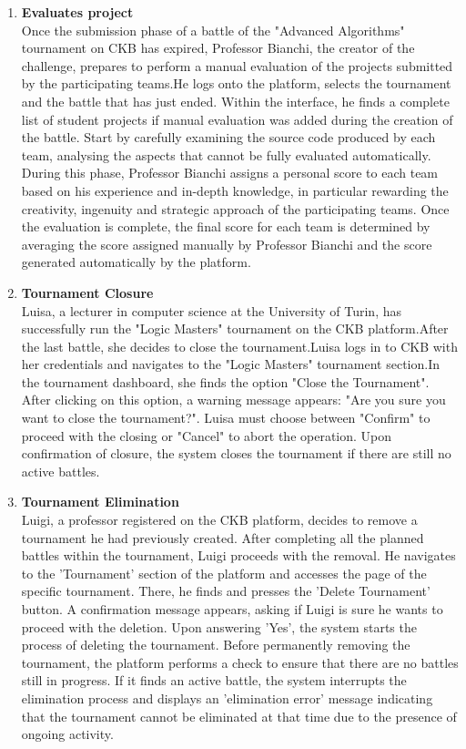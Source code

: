 \begin{enumerate}[label=\textbf{\Alph*}.]
\item \textbf{Evaluates project} \\
Once the submission phase of a battle of the "Advanced Algorithms" tournament on CKB has expired, Professor Bianchi, the creator of the challenge, prepares to perform a manual evaluation of the projects submitted by the participating teams.He logs onto the platform, selects the tournament and the battle that has just ended. Within the interface, he finds a complete list of student projects if manual evaluation was added during the creation of the battle.
Start by carefully examining the source code produced by each team, analysing the aspects that cannot be fully evaluated automatically.
During this phase, Professor Bianchi assigns a personal score to each team based on his experience and in-depth knowledge, in particular rewarding the creativity, ingenuity and strategic approach of the participating teams. Once the evaluation is complete, the final score for each team is determined by averaging the score assigned manually by Professor Bianchi and the score generated automatically by the platform.
\item \textbf{Tournament Closure}\\
Luisa, a lecturer in computer science at the University of Turin, has successfully run the "Logic Masters" tournament on the CKB platform.After the last battle, she decides to close the tournament.Luisa logs in to CKB with her credentials and navigates to the "Logic Masters" tournament section.In the tournament dashboard, she finds the option "Close the Tournament".	After clicking on this option, a warning message appears: "Are you sure you want to close the tournament?".
Luisa must choose between "Confirm" to proceed with the closing or "Cancel" to abort the operation. Upon confirmation of closure, the system closes the tournament if there are still no active battles.
\item \textbf{Tournament Elimination}\\
Luigi, a professor registered on the CKB platform, decides to remove a tournament he had previously created. After completing all the planned battles within the tournament, Luigi proceeds with the removal. He navigates to the 'Tournament' section of the platform and accesses the page of the specific tournament. There, he finds and presses the 'Delete Tournament' button. A confirmation message appears, asking if Luigi is sure he wants to proceed with the deletion. Upon answering 'Yes', the system starts the process of deleting the tournament.
Before permanently removing the tournament, the platform performs a check to ensure that there are no battles still in progress. If it finds an active battle, the system interrupts the elimination process and displays an 'elimination error' message indicating that the tournament cannot be eliminated at that time due to the presence of ongoing activity. 
\end{enumerate}
